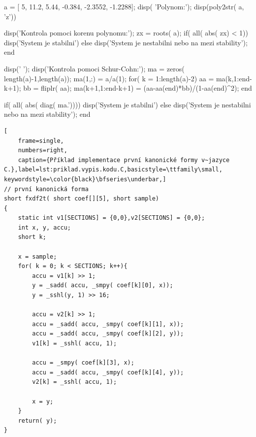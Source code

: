 \begin{matlab}[frame=single,float=htbp,caption={Příklad Schur-Cohnova testu stability v~prostředí Matlab.},label=lst:priklad.vypis.kodu.Matlab,numberstyle=\scriptsize, numbersep=7pt]

a = [ 5, 11.2, 5.44, -0.384, -2.3552, -1.2288];
disp( 'Polynom:'); disp(poly2str( a, 'z'))

disp('Kontrola pomoci korenu polynomu:');
zx = roots( a);
if( all( abs( zx) < 1))
    disp('System je stabilni')
else
    disp('System je nestabilni nebo na mezi stability');
end

disp(' '); disp('Kontrola pomoci Schur-Cohn:');
ma = zeros( length(a)-1,length(a));
ma(1,:) = a/a(1);
for( k = 1:length(a)-2)
    aa = ma(k,1:end-k+1);
    bb = fliplr( aa);
    ma(k+1,1:end-k+1) = (aa-aa(end)*bb)/(1-aa(end)^2);
end

if( all( abs( diag( ma.'))))
    disp('System je stabilni')
else
    disp('System je nestabilni nebo na mezi stability');
end
\end{matlab}

\noindent

\begin{minipage}{\linewidth}
\begin{lstlisting}[
	frame=single,
	numbers=right,
	caption={Příklad implementace první kanonické formy v~jazyce C.},label=lst:priklad.vypis.kodu.C,basicstyle=\ttfamily\small, keywordstyle=\color{black}\bfseries\underbar,]
// první kanonická forma
short fxdf2t( short coef[][5], short sample)
{
	static int v1[SECTIONS] = {0,0},v2[SECTIONS] = {0,0};
	int x, y, accu;
	short k;

	x = sample;
	for( k = 0; k < SECTIONS; k++){
		accu = v1[k] >> 1;
		y = _sadd( accu, _smpy( coef[k][0], x));
		y = _sshl(y, 1) >> 16;

		accu = v2[k] >> 1;
		accu = _sadd( accu, _smpy( coef[k][1], x));
		accu = _sadd( accu, _smpy( coef[k][2], y));
		v1[k] = _sshl( accu, 1);

		accu = _smpy( coef[k][3], x);
		accu = _sadd( accu, _smpy( coef[k][4], y));
		v2[k] = _sshl( accu, 1);

		x = y;
	}
	return( y);
}
\end{lstlisting}
\end{minipage}







